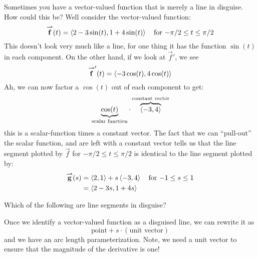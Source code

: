 \documentclass{ximera}
\begin{document}
Sometimes you have a vector-valued function that is merely a line in
disguise. How could this be? Well consider
the vector-valued function:
\[
{\overset{\boldsymbol{\rightharpoonup}}{\mathbf{f}}}(t) = \left\langle 2-3\sin(t),1+4\sin(t)\right\rangle\quad \text{for $-\pi/2\le t\le \pi/2$}
\]
This doesn't look very much like a line, for one thing it has the
function $\sin(t)$ in each component. On the other hand, if we look
at $\vec{f}'$, we see
\[
{\overset{\boldsymbol{\rightharpoonup}}{\mathbf{f}}}'(t) = \left\langle -3\cos(t),4\cos(t)\right\rangle
\]
Ah, we can now factor a $\cos(t)$ out of each component to get:
\[
\underbrace{\cos(t)}_{\text{scalar function}}\cdot \overbrace{\left\langle -3,4\right\rangle}^{\text{constant vector}}
\]
this is a scalar-function times a constant vector. The fact that we
can ``pull-out'' the scalar function, and are left with a constant
vector tells us that the line segment plotted by $\vec{f}$ for
$-\pi/2\le t\le \pi/2$ is identical to the line segment plotted by:
\begin{align*}
  {\overset{\boldsymbol{\rightharpoonup}}{\mathbf{g}}}(s) &=\left\langle 2,1\right\rangle + s \left\langle -3,4\right\rangle\quad \text{for $-1\le s\le 1$}\\
  &=\left\langle 2-3s,1+4s\right\rangle
\end{align*}
\begin{question}
  Which of the following are line segments in disguise?
  \begin{selectAll}
  \end{selectAll}
\end{question}
Once we identify a vector-valued function as a disguised line, we
can rewrite it as
\[
\text{point}+ s \cdot \left(\text{unit vector}\right)
\]
and we have an arc length parameterization. Note, we need a unit
vector to ensure that the magnitude of the derivative is one!
\end{document}
